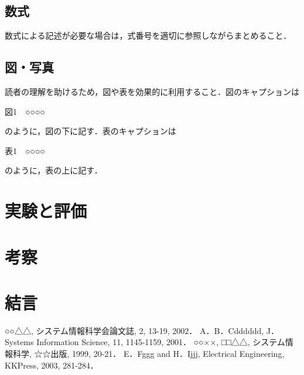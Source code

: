 \documentclass[11pt]{ujarticle} %
\begin{document}
\subsection{数式}

数式による記述が必要な場合は，式番号を適切に参照しながらまとめること．

\subsection{図・写真}

読者の理解を助けるため，図や表を効果的に利用すること．図のキャプションは

\begin{center}図1　○○○○\end{center}

のように，図の下に記す．表のキャプションは

\begin{center}表1　○○○○\end{center}

のように，表の上に記す．

\section{実験と評価}

\section{考察}

\section{結言}

\begin{thebibliography}{99}
	○○△△, システム情報科学会論文誌, 2, 13-19, 2002．
	A．B．Cdddddd, J． Systems Information Science, 11, 1145-1159, 2001．
	○○××, □□△△, システム情報科学, ☆☆出版, 1999, 20-21．
	E．Fggg and H．Ijjj, Electrical Engineering, KKPress, 2003, 281-284．
\end{thebibliography}
\end{document}
